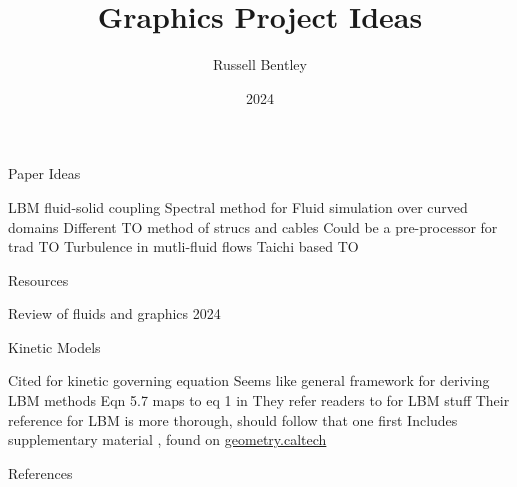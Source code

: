\documentclass{beamer}
\title{Graphics Project Ideas}
\author{Russell Bentley}
\institute{Stony Brook}
\date{2024}
\begin{document}
\frame{\titlepage}

\begin{frame}{Paper Ideas}
\begin{outline}
\1 LBM fluid-solid coupling \cite{Lyu2021}
\1 Spectral method for Fluid simulation over curved domains \cite{Cui2021}
\1 Different TO method of strucs and cables \cite{Rowe2023}
  \2 Could be a pre-processor for trad TO
\1 Turbulence in mutli-fluid flows \cite{Li2024}
\1 Taichi based TO \cite{Liu2018}
\end{outline}
\end{frame}

\begin{frame}{Resources}
  \begin{outline}
  \1 Review of fluids and graphics 2024 \cite{Wang2024}
  \end{outline}
\end{frame}

\begin{frame}{Kinetic Models}
  \begin{outline}
\1 Cited for kinetic governing equation \cite{Shan2006}
  \2 Seems like general framework for deriving LBM methods
  \2 Eqn 5.7 maps to eq 1 in \cite{Lyu2021}
\1 They refer readers to \cite{Li2020} for LBM stuff
  \2 Their reference for LBM is more thorough, should follow that one first
  \2 Includes supplementary material \cite{Li2020Supplement}, found on \href{http://www.geometry.caltech.edu/pubs.html}{geometry.caltech}
  \end{outline}
\end{frame}

\begin{frame}[allowframebreaks]{References}
    \tiny
    \printbibliography
\end{frame}
\end{document}
